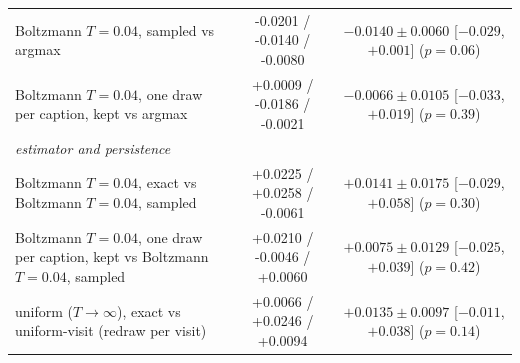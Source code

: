 \documentclass[11pt,a4paper]{article}
\begin{document}
\begin{table}[ht]
{\begin{tabular}{l c c}
Boltzmann $T{=}0.04$, sampled vs argmax & -0.0201 / -0.0140 / -0.0080 & $-0.0140 \pm 0.0060$ [$-0.029$, $+0.001$] ($p=0.06$) \\
Boltzmann $T{=}0.04$, one draw per caption, kept vs argmax & +0.0009 / -0.0186 / -0.0021 & $-0.0066 \pm 0.0105$ [$-0.033$, $+0.019$] ($p=0.39$) \\
\midrule
\multicolumn{3}{l}{\emph{estimator and persistence}} \\
Boltzmann $T{=}0.04$, exact vs Boltzmann $T{=}0.04$, sampled & +0.0225 / +0.0258 / -0.0061 & $+0.0141 \pm 0.0175$ [$-0.029$, $+0.058$] ($p=0.30$) \\
Boltzmann $T{=}0.04$, one draw per caption, kept vs Boltzmann $T{=}0.04$, sampled & +0.0210 / -0.0046 / +0.0060 & $+0.0075 \pm 0.0129$ [$-0.025$, $+0.039$] ($p=0.42$) \\
uniform ($T\to\infty$), exact vs uniform-visit (redraw per visit) & +0.0066 / +0.0246 / +0.0094 & $+0.0135 \pm 0.0097$ [$-0.011$, $+0.038$] ($p=0.14$) \\
\bottomrule
\end{tabular}}
\end{table}
\end{document}
